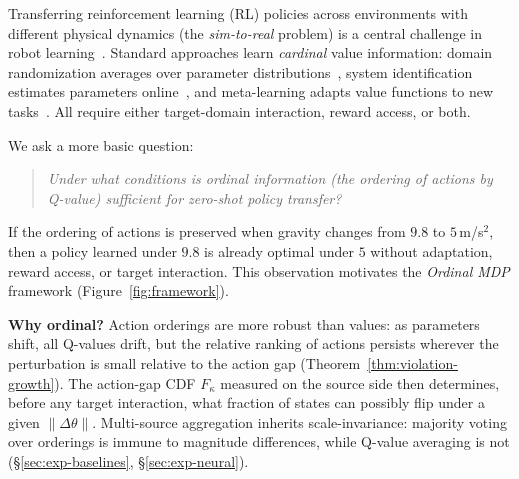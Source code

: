 \documentclass{article}
\begin{document}
Transferring reinforcement learning (RL) policies across environments with different physical dynamics (the \emph{sim-to-real} problem) is a central challenge in robot learning~\citep{zhao2020sim, muratore2022robot}. Standard approaches learn \emph{cardinal} value information: domain randomization averages over parameter distributions~\citep{tobin2017domain, peng2018sim}, system identification estimates parameters online~\citep{ljung1998system, yu2017preparing}, and meta-learning adapts value functions to new tasks~\citep{finn2017model, rakelly2019efficient}. All require either target-domain interaction, reward access, or both.

We ask a more basic question:
\begin{quote}
\emph{Under what conditions is ordinal information (the ordering of actions by Q-value) sufficient for zero-shot policy transfer?}
\end{quote}

If the ordering of actions is preserved when gravity changes from $9.8$ to $5$\,m/s$^2$, then a policy learned under $9.8$ is already optimal under $5$ without adaptation, reward access, or target interaction. This observation motivates the \emph{Ordinal MDP} framework (Figure~\ref{fig:framework}).

\textbf{Why ordinal?} Action orderings are more robust than values: as parameters shift, all Q-values drift, but the relative ranking of actions persists wherever the perturbation is small relative to the action gap (Theorem~\ref{thm:violation-growth}). The action-gap CDF $F_\kappa$ measured on the source side then determines, before any target interaction, what fraction of states can possibly flip under a given $\|\Delta\theta\|$. Multi-source aggregation inherits scale-invariance: majority voting over orderings is immune to magnitude differences, while Q-value averaging is not (\S\ref{sec:exp-baselines}, \S\ref{sec:exp-neural}).
\end{document}
